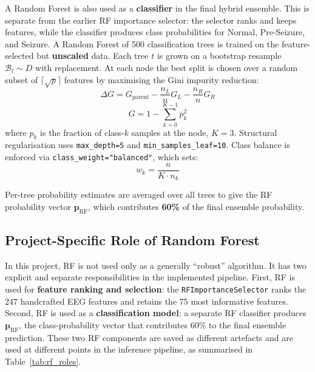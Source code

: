 \documentclass[12pt, a4paper]{report}
\begin{document}
A Random Forest is also used as a \textbf{classifier} in the final hybrid
ensemble. This is separate from the earlier RF importance selector:
the selector ranks and keeps features, while the classifier produces
class probabilities for Normal, Pre-Seizure, and Seizure. A Random Forest
of 500 classification trees is trained on the feature-selected but
\textbf{unscaled} data. Each tree $t$ is grown on a bootstrap resample
$\mathcal{B}_t \sim D$ with replacement. At each
node the best split is chosen over a random subset of
$\lceil\sqrt{p}\rceil$ features by maximising the Gini impurity reduction:
\begin{equation}
  \Delta G = G_{\text{parent}}
             - \frac{n_L}{n}G_L
             - \frac{n_R}{n}G_R
  \label{eq:gini}
\end{equation}
\begin{equation}
  G = 1 - \sum_{k=0}^{K-1} p_k^2
  \label{eq:gini_def}
\end{equation}
where $p_k$ is the fraction of class-$k$ samples at the node, $K=3$.
Structural regularisation uses \texttt{max\_depth=5} and
\texttt{min\_samples\_leaf=10}. Class balance is enforced via
\texttt{class\_weight="balanced"}, which sets:
\begin{equation}
  w_k = \frac{n}{K \cdot n_k}
  \label{eq:rf_classweight}
\end{equation}

Per-tree probability estimates are averaged over all trees to give the
RF probability vector $\mathbf{p}_{\text{RF}}$, which contributes
\textbf{60\%} of the final ensemble probability.

\subsection{Project-Specific Role of Random Forest}
\label{sec:rf_project_role}

In this project, RF is not used only as a generally ``robust'' algorithm.
It has two explicit and separate responsibilities in the implemented
pipeline. First, RF is used for \textbf{feature ranking and selection}:
the \texttt{RFImportanceSelector} ranks the 247 handcrafted EEG features
and retains the 75 most informative features. Second, RF is used as a
\textbf{classification model}: a separate RF classifier produces
$\mathbf{p}_{\text{RF}}$, the class-probability vector that contributes
60\% to the final ensemble prediction. These two RF components are saved
as different artefacts and are used at different points in the inference
pipeline, as summarised in Table~\ref{tab:rf_roles}.
\end{document}
